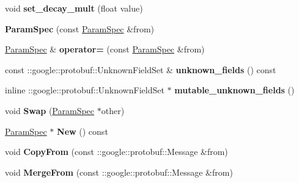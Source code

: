 \begin{DoxyCompactItemize}
void {\bfseries set\+\_\+decay\+\_\+mult} (float value)
\item 
\mbox{\label{classcaffe_1_1_param_spec_a2f858d8555814fa4436d3a055ac0405f}} 
{\bfseries Param\+Spec} (const \mbox{\hyperlink{classcaffe_1_1_param_spec}{Param\+Spec}} \&from)
\item 
\mbox{\label{classcaffe_1_1_param_spec_ac773f770b07847c56e03b32521362834}} 
\mbox{\hyperlink{classcaffe_1_1_param_spec}{Param\+Spec}} \& {\bfseries operator=} (const \mbox{\hyperlink{classcaffe_1_1_param_spec}{Param\+Spec}} \&from)
\item 
\mbox{\label{classcaffe_1_1_param_spec_a792ad9a9903e4be3abdd0531b20346c4}} 
const \+::google\+::protobuf\+::\+Unknown\+Field\+Set \& {\bfseries unknown\+\_\+fields} () const
\item 
\mbox{\label{classcaffe_1_1_param_spec_afc2d824cca1c78e261455545e46a8ff0}} 
inline \+::google\+::protobuf\+::\+Unknown\+Field\+Set $\ast$ {\bfseries mutable\+\_\+unknown\+\_\+fields} ()
\item 
\mbox{\label{classcaffe_1_1_param_spec_a489a8bc81534946e38bbe0057eca729d}} 
void {\bfseries Swap} (\mbox{\hyperlink{classcaffe_1_1_param_spec}{Param\+Spec}} $\ast$other)
\item 
\mbox{\label{classcaffe_1_1_param_spec_aa4610addacf5fc321ba820603d484c60}} 
\mbox{\hyperlink{classcaffe_1_1_param_spec}{Param\+Spec}} $\ast$ {\bfseries New} () const
\item 
\mbox{\label{classcaffe_1_1_param_spec_ac4d4e0aee25da0b14a0d41e20ad713df}} 
void {\bfseries Copy\+From} (const \+::google\+::protobuf\+::\+Message \&from)
\item 
\mbox{\label{classcaffe_1_1_param_spec_abf436ef64acc3cfb6d11ae3b37f7fa92}} 
void {\bfseries Merge\+From} (const \+::google\+::protobuf\+::\+Message \&from)
\item 
\mbox{\label{classcaffe_1_1_param_spec_a6d2e53c833ac70d8f001f74e60807611}} 

\end{DoxyCompactItemize}
